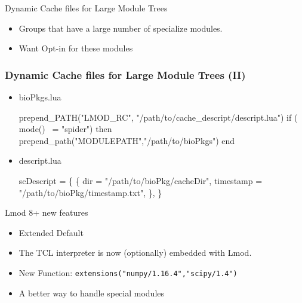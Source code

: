\documentclass{beamer}
\begin{document}
\begin{frame}{Dynamic Cache files for Large Module Trees}
  \begin{itemize}
    \item Groups that have a large number of specialize modules.
    \item Want Opt-in for these modules
  \end{itemize}
\end{frame}

\begin{frame}[fragile]
  \frametitle{Dynamic Cache files for Large Module Trees (II)}
  \begin{itemize}
    \item bioPkgs.lua
    {\tiny
\begin{semiverbatim}
  prepend\_PATH("LMOD\_RC", "/path/to/cache\_descript/descript.lua")
  if ( mode() ~= "spider") then 
     prepend\_path("MODULEPATH","/path/to/bioPkgs")
  end
\end{semiverbatim}
    }
    \item descript.lua
    {\tiny
\begin{semiverbatim}
  scDescript = \{
     \{
        dir = "/path/to/bioPkg/cacheDir",
        timestamp = "/path/to/bioPkg/timestamp.txt",
     \},
  \}
\end{semiverbatim}
    }
    \end{itemize}
\end{frame}


\begin{frame}{Lmod 8+ new features}
  \begin{itemize}
    \item Extended Default
    \item The TCL interpreter is now (optionally) embedded with Lmod.
    \item New Function: \texttt{extensions("numpy/1.16.4","scipy/1.4")}
    \item A better way to handle special modules
  \end{itemize}
\end{frame}

\end{document}

